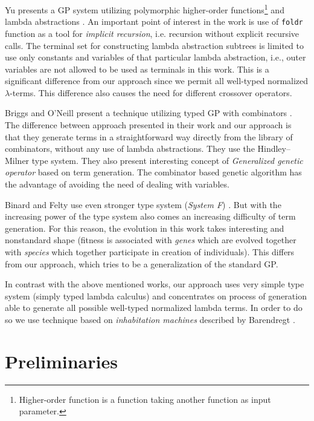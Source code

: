 \documentclass{sig-alternate}
\newcommand{\lterms}{$\lambda$-terms\xspace}
\begin{document}
Yu presents a GP system utilizing
polymorphic higher-order functions\footnote{Higher-order 
function is a function taking another function as 
input parameter.} and lambda abstractions  \cite{yu01}.
An important point of interest in the work is use of
\texttt{foldr} function as a tool for \textit{implicit recursion}, i.e. recursion without explicit recursive calls. The terminal set for constructing lambda abstraction subtrees  is limited to use only constants and variables of that particular lambda abstraction, i.e., outer variables are not allowed to be used as terminals in this work. This is a significant difference from our approach since we permit all well-typed normalized \lterms. This difference also causes the need for different crossover operators.  

Briggs and O’Neill present a technique 
utilizing typed GP with combinators \cite{kes}.
The difference between approach presented in their work
and our approach is that they generate terms in a straightforward way directly from the library of combinators, without any use of lambda abstractions. They use the Hindley–Milner type system. They also present interesting concept of \textit{Generalized genetic operator} based on term generation. The combinator based genetic algorithm has the advantage of
avoiding the need of dealing with variables.

Binard and Felty use even stronger type system (\textit{System F}) \cite{binard2008genetic}. But with the increasing power of the type system also comes an increasing difficulty of term generation. For this reason, the evolution in this work takes interesting and nonstandard shape (fitness is associated with \textit{genes} which are evolved together with \textit{species} which together participate in creation of individuals). This differs from our approach, which tries to be a generalization of the standard GP\cite{koza92}.

In contrast with the above mentioned works, our approach uses very simple type system (simply typed lambda calculus) and concentrates on process of generation  
able to generate all possible well-typed normalized lambda terms. In order to do so we use technique based on \textit{inhabitation machines} described by Barendregt \cite{barendregt10}.    

\section{Preliminaries}
\label{preliminaries}
\end{document}
